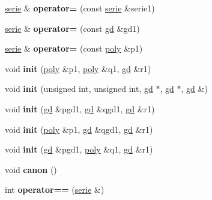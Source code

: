 \begin{DoxyCompactItemize}
\mbox{\hyperlink{classmmgd_1_1serie}{serie}} \& {\bfseries operator=} (const \mbox{\hyperlink{classmmgd_1_1serie}{serie}} \&serie1)
\item 
\mbox{\label{classmmgd_1_1serie_a2f14a188cfab4354429d9f0f87a82e58}} 
\mbox{\hyperlink{classmmgd_1_1serie}{serie}} \& {\bfseries operator=} (const \mbox{\hyperlink{classmmgd_1_1gd}{gd}} \&gd1)
\item 
\mbox{\label{classmmgd_1_1serie_a21cca4fee933ae71f605215b13a612ae}} 
\mbox{\hyperlink{classmmgd_1_1serie}{serie}} \& {\bfseries operator=} (const \mbox{\hyperlink{classmmgd_1_1poly}{poly}} \&p1)
\item 
\mbox{\label{classmmgd_1_1serie_a3ec7bfdba701b17e56c055e0a9486b6e}} 
void {\bfseries init} (\mbox{\hyperlink{classmmgd_1_1poly}{poly}} \&p1, \mbox{\hyperlink{classmmgd_1_1poly}{poly}} \&q1, \mbox{\hyperlink{classmmgd_1_1gd}{gd}} \&r1)
\item 
\mbox{\label{classmmgd_1_1serie_ac01a3e0aea64486c264500293c6313d6}} 
void {\bfseries init} (unsigned int, unsigned int, \mbox{\hyperlink{classmmgd_1_1gd}{gd}} $\ast$, \mbox{\hyperlink{classmmgd_1_1gd}{gd}} $\ast$, \mbox{\hyperlink{classmmgd_1_1gd}{gd}} \&)
\item 
\mbox{\label{classmmgd_1_1serie_a15d0c0636e2cf65ee8af81def95d0242}} 
void {\bfseries init} (\mbox{\hyperlink{classmmgd_1_1gd}{gd}} \&pgd1, \mbox{\hyperlink{classmmgd_1_1gd}{gd}} \&qgd1, \mbox{\hyperlink{classmmgd_1_1gd}{gd}} \&r1)
\item 
\mbox{\label{classmmgd_1_1serie_a1485f36c62d4a6d3c5861c12219d28e2}} 
void {\bfseries init} (\mbox{\hyperlink{classmmgd_1_1poly}{poly}} \&p1, \mbox{\hyperlink{classmmgd_1_1gd}{gd}} \&qgd1, \mbox{\hyperlink{classmmgd_1_1gd}{gd}} \&r1)
\item 
\mbox{\label{classmmgd_1_1serie_a63454c770de7d4ee7f0216c21183574b}} 
void {\bfseries init} (\mbox{\hyperlink{classmmgd_1_1gd}{gd}} \&pgd1, \mbox{\hyperlink{classmmgd_1_1poly}{poly}} \&q1, \mbox{\hyperlink{classmmgd_1_1gd}{gd}} \&r1)
\item 
\mbox{\label{classmmgd_1_1serie_a37939ffcb52ec8f82a45c54e34b8d3fe}} 
void {\bfseries canon} ()
\item 
\mbox{\label{classmmgd_1_1serie_a1d28f3f8c8f4a4f5e7b3cf17102faf25}} 
int {\bfseries operator==} (\mbox{\hyperlink{classmmgd_1_1serie}{serie}} \&)
\end{DoxyCompactItemize}
